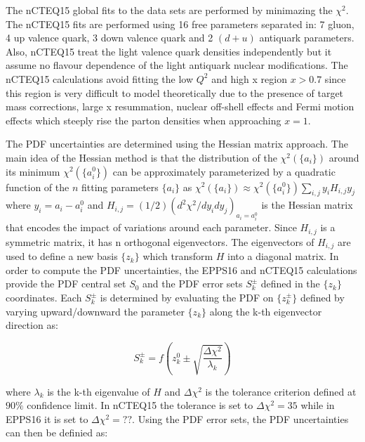 The nCTEQ15 global fits to the data sets are performed by minimazing the $\chi^{2}$. The nCTEQ15 fits are performed using 16 free parameters separated in: 7 gluon, 4 up valence quark, 3 down valence quark and 2 $\left(d+u\right)$ antiquark parameters. Also, nCTEQ15 treat the light valence quark densities independently but it assume no flavour dependence of the light antiquark nuclear modifications. The nCTEQ15 calculations avoid fitting the low $Q^{2}$ and high x region $x>0.7$ since this region is very difficult to model theoretically due to the presence of target mass corrections, large x resummation, nuclear off-shell effects and Fermi motion effects which steeply rise the parton densities when approaching $x=1$.

The PDF uncertainties are determined using the Hessian matrix approach. The main idea of the Hessian method is that the distribution of the $\chi^{2}\left(\{a_{i}\}\right)$ around its minimum $\chi^{2}\left(\{a^{0}_{i}\}\right)$ can be approximately parameterized by a quadratic function of the $n$ fitting parameters $\{a_{i}\}$ as $\chi^{2}\left(\{a_{i}\}\right)\approx{\chi^{2}\left(\{a^{0}_{i}\}\right)}\sum_{i,j}y_{i}H_{i,j}y_{j}$ where $y_{i}=a_{i}-a_{i}^{0}$ and $H_{i,j}=\left(1/2\right)\left(d^{2}\chi^{2}/dy_{i}dy_{j}\right)_{a_{i}=a_{i}^{0}}$ is the Hessian matrix that encodes the impact of variations around each parameter. Since $H_{i,j}$ is a symmetric matrix, it has n orthogonal eigenvectors. The eigenvectors of $H_{i,j}$ are used to define a new basis $\{z_{k}\}$ which  transform $H$ into a diagonal matrix. In order to compute the PDF uncertainties, the EPPS16 and nCTEQ15 calculations provide the PDF central set $S_{0}$ and the PDF error sets $S^{\pm}_{k}$ defined in the $\{z_{k}\}$ coordinates. Each $S^{\pm}_{k}$ is determined by evaluating the PDF on $\{z^{\pm}_{k}\}$ defined by varying upward/downward the parameter $\{z_{k}\}$ along the k-th eigenvector direction as:

\begin{equation}
  S^{\pm}_{k} = f\left(z^{0}_{k} \pm \sqrt{\frac{\Delta{\chi^{2}}}{\lambda_{k}}}\right)
\end{equation}

where $\lambda_{k}$ is the k-th eigenvalue of $H$ and $\Delta{\chi^{2}}$ is the tolerance criterion defined at $90\%$ confidence limit. In nCTEQ15 the tolerance is set to $\Delta{\chi^{2}}=35$ while in EPPS16 it is set to $\Delta{\chi^{2}}=??$. Using the PDF error sets, the PDF uncertainties can then be definied as:

